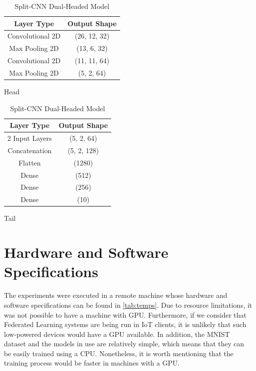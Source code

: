 \begin{table}[!h]
    \begin{subtable}[h]{0.49\textwidth}
        \centering
        \begin{tabular}{c|c}
            \hline \hline
            Layer Type       & Output Shape \\ \hline \hline
            Convolutional 2D & (26, 12, 32) \\ \hline
            Max Pooling 2D   & (13, 6, 32) \\ \hline
            Convolutional 2D & (11, 11, 64) \\ \hline
            Max Pooling 2D   & (5, 2, 64)   \\ \hline
        \end{tabular}
        \caption{Head}
    \end{subtable}
    \hfill
    \begin{subtable}[h]{0.49\textwidth}
        \centering
        \begin{tabular}{c|c}
            \hline\hline
            Layer Type     & Output Shape \\ \hline\hline
            2 Input Layers & (5, 2, 64)   \\ \hline
            Concatenation  & (5, 2, 128)  \\ \hline
            Flatten        & (1280)       \\ \hline
            Dense          & (512)        \\ \hline
            Dense          & (256)        \\ \hline
            Dense          & (10)         \\ \hline
        \end{tabular}
        \caption{Tail}
     \end{subtable}
     \caption{Split-CNN Dual-Headed Model}
     \label{tab:splitnn}
\end{table}

\section{Hardware and Software Specifications}

The experiments were executed in a remote machine whose hardware and software specifications can be found in \autoref{tab:temps}. Due to resource limitations, it was not possible to have a machine with GPU. Furthermore, if we consider that Federated Learning systems are being run in IoT clients, it is unlikely that such low-powered devices would have a GPU available. In addition, the MNIST dataset and the models in use are relatively simple, which means that they can be easily trained using a CPU. Nonetheless, it is worth mentioning that the training process would be faster in machines with a GPU.


